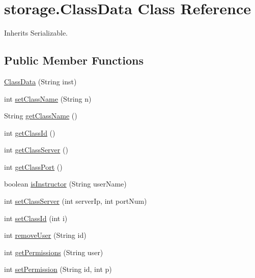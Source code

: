 \hypertarget{classstorage_1_1_class_data}{
\section{storage.\-Class\-Data \-Class \-Reference}
\label{classstorage_1_1_class_data}
}


\-Inherits \-Serializable.

\subsection*{\-Public \-Member \-Functions}
\begin{DoxyCompactItemize}
\item 
\hyperlink{classstorage_1_1_class_data_abe9330d81fe75ab6def9c0d859da3977}{\-Class\-Data} (\-String inst)
\item 
int \hyperlink{classstorage_1_1_class_data_a5d2f11d8822f7bfaea66ffb4edb2348d}{set\-Class\-Name} (\-String n)
\item 
\-String \hyperlink{classstorage_1_1_class_data_aa7bbd6db37a430c6d91e61474c9bcfae}{get\-Class\-Name} ()
\item 
int \hyperlink{classstorage_1_1_class_data_a58435f26060509a99ae40a8fc680a4f0}{get\-Class\-Id} ()
\item 
int \hyperlink{classstorage_1_1_class_data_a1d55e9e5dc3323070f522db8847b459a}{get\-Class\-Server} ()
\item 
int \hyperlink{classstorage_1_1_class_data_aef871e28cb00ac9c34d2ec1378d9fa52}{get\-Class\-Port} ()
\item 
boolean \hyperlink{classstorage_1_1_class_data_a50def72f073abddeb123f39a4a7882b7}{is\-Instructor} (\-String user\-Name)
\item 
int \hyperlink{classstorage_1_1_class_data_a0ce5ea5c6a2608bdb337fa8750476ce3}{set\-Class\-Server} (int server\-Ip, int port\-Num)
\item 
int \hyperlink{classstorage_1_1_class_data_ac8adea15624f5ec9ef5c4062e27d3885}{set\-Class\-Id} (int i)
\item 
int \hyperlink{classstorage_1_1_class_data_afbba8de8c504df71baab327caadddb39}{remove\-User} (\-String id)
\item 
int \hyperlink{classstorage_1_1_class_data_a215e351a6f1186a029073a6e80b265d3}{get\-Permissions} (\-String user)
\item 
int \hyperlink{classstorage_1_1_class_data_ad8265988291d576c10288c29907bb172}{set\-Permission} (\-String id, int p)
\end{DoxyCompactItemize}
